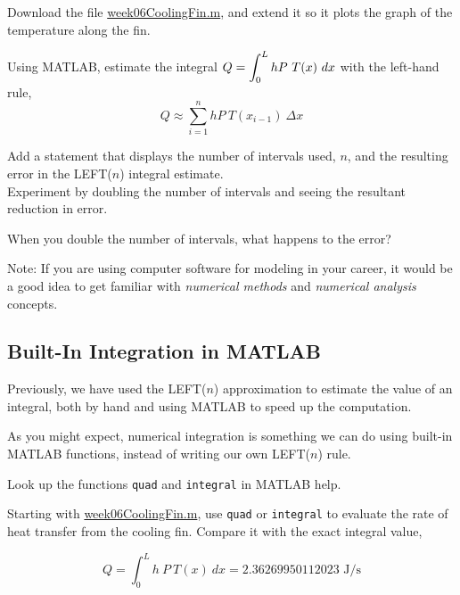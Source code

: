 \newpage

\problem Download the file
\href{http://www.mast.queensu.ca/~apsc171/MNTCP01/Notes/MATLAB/week06CoolingFin.m}{week06CoolingFin.m},
and extend it so it plots the graph of the temperature along the fin.

Using MATLAB, estimate the integral $\displaystyle Q = \int_0^L h P ~T(x) ~dx$
with the left-hand rule,
$$ Q \approx \sum_{i=1}^n h P ~T(x_{i-1})~ \Delta x$$

\vsc

\newpage

\problem Add a statement that displays the number of intervals used,
$n$, and the resulting error in the LEFT($n$) integral estimate. \\
Experiment by doubling the number of intervals and seeing the
resultant reduction in error.

\vsc

When you double the number of intervals, what happens to the error?

\vfill

Note: If you are using computer software for modeling in your career,
it would be a good idea to get familiar with {\em numerical methods}
and {\em numerical analysis} concepts.

\newpage 
{}
\subsection*{Built-In Integration in MATLAB }

Previously, we have used the LEFT($n$) approximation to estimate the
value of an integral, both by hand and using MATLAB to speed up the
computation.

As you might expect, numerical integration is something we can do
using built-in MATLAB functions, instead of writing our own LEFT($n$)
rule.

\problem Look up the functions \texttt{quad} and \texttt{integral} in
MATLAB help.

\vsc

\newpage

\problem Starting with
\href{http://www.mast.queensu.ca/~apsc171/MNTCP01/Notes/MATLAB/week06CoolingFin.m}{week06CoolingFin.m},
use \texttt{quad} or \texttt{integral} to evaluate the rate of heat
transfer from the cooling fin.  Compare it with the exact integral
value,

$$
Q = \int_0^{L} h ~P ~T(x) ~dx = 2.36269950112023 \mbox{ J/s}
$$


